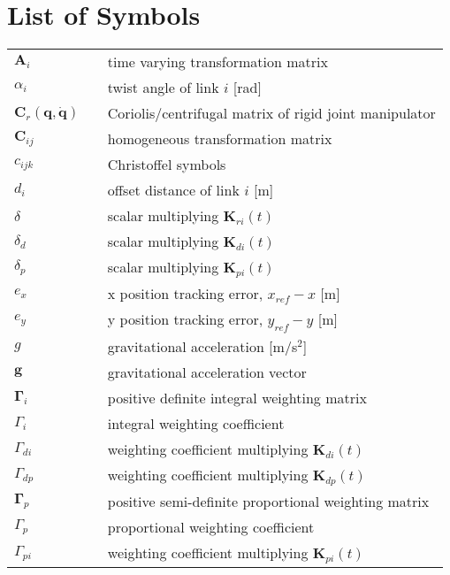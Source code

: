 \chapter*{List of Symbols}

\begin{longtable}[ht]{lll}
			$\mathbf{A}_{i}$								&  & time varying transformation matrix\\ 
			$\alpha_{i}$										&  & twist angle of link $i$ [rad]\\
			$\mathbf{C}_{r}(\mathbf{q},\mathbf{\dot{q}})$	&  & Coriolis/centrifugal matrix of rigid joint manipulator\\
			$\mathbf{C}_{ij}$								&  & homogeneous transformation matrix\\
			$c_{ijk}$												&  & Christoffel symbols\\
			$d_{i}$													&  & offset distance of link $i$ [m]\\
			$\delta$												&  & scalar multiplying $\mathbf{K}_{ri}(t)$\\ 
			$\delta_{d}$										&  & scalar multiplying $\mathbf{K}_{di}(t)$\\ 
			$\delta_{p}$										&  & scalar multiplying $\mathbf{K}_{pi}(t)$\\ 
			$e_{x}$													&  & x position tracking error, $x_{ref}-x$ [m]\\ 
			$e_{y}$													&  & y position tracking error, $y_{ref}-y$ [m]\\ 
			$g$															&  & gravitational acceleration [m/s$^2$]\\
			$\mathbf{g}$										&  & gravitational acceleration vector\\
			$\mathbf{\Gamma}_{i}$						&	 & positive definite integral weighting matrix\\
			$\Gamma_{i}$										&	 & integral weighting coefficient\\		
			$\Gamma_{di}$										&	 & weighting coefficient multiplying $\mathbf{K}_{di}(t)$\\
			$\Gamma_{dp}$   								&	 & weighting coefficient multiplying $\mathbf{K}_{dp}(t)$\\
			$\mathbf{\Gamma}_{p}$   				&	 & positive semi-definite proportional weighting matrix\\
			$\Gamma_{p}$   									&	 & proportional weighting coefficient\\
			$\Gamma_{pi}$										&	 & weighting coefficient multiplying $\mathbf{K}_{pi}(t)$\\

\end{longtable}
